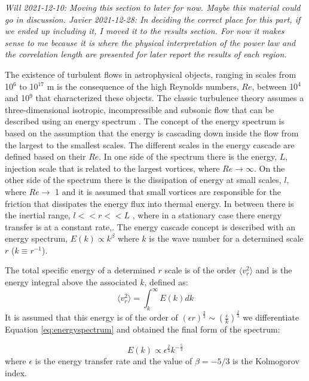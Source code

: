\documentclass[fleqn,usenatbib, useAMS, a4paper]{mnras}
\begin{document}
\textit{Will 2021-12-10: Moving this section to later for now. Maybe
  this material could go in discussion. Javier 2021-12-28: In deciding the correct place for this part, if we ended up including it, I moved it to the results section. For now it makes sense to me because it is where the physical interpretation of the power law and the correlation length are presented for later report the results of each region.}

The existence of turbulent flows in astrophysical objects, ranging in scales from 10$^{6}$ to 10$^{17}$ m \citep{2010ApJ...710..853C} is the consequence of the high Reynolds numbers, $Re$, between 10$^{4}$ and 10$^{9}$ \citep{1949ApJ...110..329C,lagrois2011} that characterized these objects.
The classic turbulence theory assumes a three-dimensional isotropic, incompressible and subsonic flow that can be described using an energy spectrum \citep{kolm1}.
The concept of the energy spectrum is based on the assumption that the energy is cascading down inside the flow from the largest to the smallest scales.
The different scales in the energy cascade are defined based on their $Re$.
In one side of the spectrum there is the energy, \(L\), injection scale that is related to the largest vortices, where $ Re \rightarrow \infty$.
On the other side of the spectrum there is the dissipation of energy at small scales, \(l\), where $Re \rightarrow$ 1 and it is assumed that small vortices are responsible for the friction that dissipates the energy flux into thermal energy.
In between there is the inertial range, \(l  << r << L\) , where in a stationary case there energy transfer is at a constant rate,.
The energy cascade concept is described with an energy spectrum, $E(k) \propto k^{\beta}$ where $k$ is the wave number for a determined scale $r$ ($k \equiv r^{-1}$).

The total specific energy of a determined $r$ scale is of the order $\langle v_{r}^{2} \rangle$ and is the energy integral above the associated $k$, defined as:
\begin{equation}\label{eq:energyspectrum}
 \langle v_{r}^{2} \rangle = \int_{k}^{\infty} E(k)dk
\end{equation}
%
It is assumed that this energy is of the order of $(\epsilon r)^{\frac{2}{3}} \sim (\frac{\epsilon}{k})^{\frac{2}{3}}$ we differentiate Equation \ref{eq:energyspectrum} and obtained the final form of the spectrum:

\begin{equation}\label{eq:kolm}
E(k) \propto \epsilon^\frac{2}{3} k^{-\frac{5}{3}}
\end{equation}
%
where \(\epsilon\) is the energy transfer rate and the value of \(\beta = -5 / 3\) is the Kolmogorov index.
\end{document}
